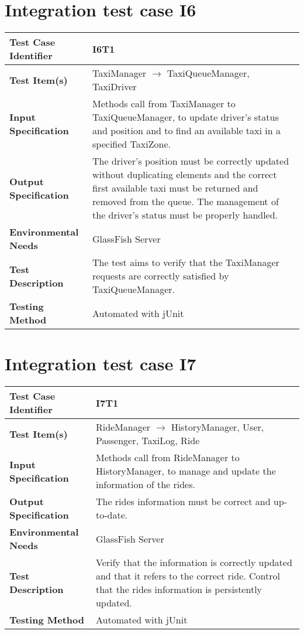 \vspace{2em}

\section{Integration test case I6}

\begin{tabular}{l p{}}
    \hline
    \textbf{Test Case Identifier} & I6T1\\
    \hline
    \textbf{Test Item(s)} & TaxiManager $\rightarrow$ TaxiQueueManager, TaxiDriver \\
    \hline
    \textbf{Input Specification} & Methods call from TaxiManager to TaxiQueueManager, to update driver's status and position and to find an available taxi in a specified TaxiZone.\\
    \hline
    \textbf{Output Specification} & The driver's position must be correctly updated without duplicating elements and the correct first available taxi must be returned and removed from the queue. The management of the driver's status must be properly handled.\\
    \hline
    \textbf{Environmental Needs} & GlassFish Server\\
    \hline
    \textbf{Test Description} & The test aims to verify that the TaxiManager requests are correctly satisfied by TaxiQueueManager.\\
    \hline
    \textbf{Testing Method} & Automated with jUnit\\
    \hline
\end{tabular}

\vspace{2em}

\section{Integration test case I7}

\begin{tabular}{l p{}}
    \hline
    \textbf{Test Case Identifier} & I7T1\\
    \hline
    \textbf{Test Item(s)} & RideManager $\rightarrow$ HistoryManager, User, Passenger, TaxiLog, Ride \\
    \hline
    \textbf{Input Specification} & Methods call from RideManager to HistoryManager, to manage and update the information of the rides.\\
    \hline
    \textbf{Output Specification} & The rides information must be correct and up-to-date.\\
    \hline
    \textbf{Environmental Needs} & GlassFish Server\\
    \hline
    \textbf{Test Description} & Verify that the information is correctly updated and that it refers to the correct ride. Control that the rides information is persistently updated.\\
    \hline
    \textbf{Testing Method} & Automated with jUnit \\
    \hline
\end{tabular}

